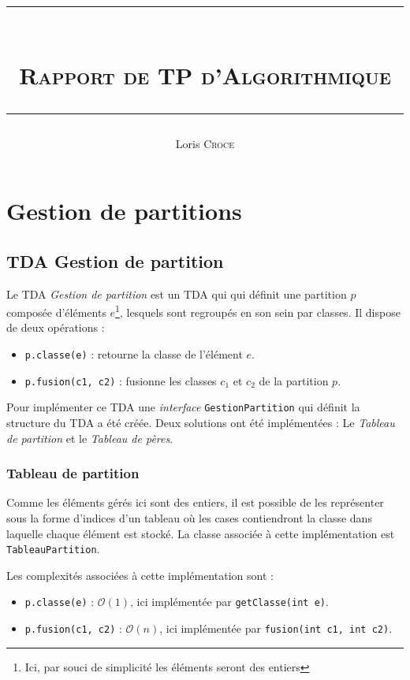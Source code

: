 \documentclass[12pt, a4paper]{report}
\author{Loris \textsc{Croce}}
\title{\rule{\textwidth}{1pt} \\ \Huge\textsc{Rapport de TP d'Algorithmique} \\ \rule{\textwidth}{1pt}}
\begin{document}
\maketitle{}

\tableofcontents

\chapter{Gestion de partitions}

    \section{TDA Gestion de partition}

    Le TDA \emph{Gestion de partition} est un TDA qui qui définit une partition $p$ composée d'éléments $e$\footnote{Ici, par souci de simplicité les éléments seront des entiers}, lesquels sont regroupés en son sein par classes. Il dispose de deux opérations :
    \begin{itemize}
        \item \texttt{p.classe(e)} : retourne la classe de l'élément $e$.
        \item \texttt{p.fusion(c1, c2)} : fusionne les classes $c_1$ et $c_2$ de la partition $p$.
    \end{itemize}


    Pour implémenter ce TDA une \emph{interface} \texttt{GestionPartition} qui définit la structure du TDA a été créée. Deux solutions ont été implémentées : Le \emph{Tableau de partition} et le \emph{Tableau de pères}.

    \subsection{Tableau de partition}

    Comme les éléments gérés ici sont des entiers, il est possible de les représenter sous la forme d'indices d'un tableau où les cases contiendront la classe dans laquelle chaque élément est stocké. La classe associée à cette implémentation est \texttt{TableauPartition}.

    Les complexités associées à cette implémentation sont :
    \begin{itemize}
        \item \texttt{p.classe(e)} : $\mathcal{O}(1)$, ici implémentée par \texttt{getClasse(int e)}.
        \item \texttt{p.fusion(c1, c2)} : $\mathcal{O}(n)$, ici implémentée par \texttt{fusion(int c1, int c2)}.
    \end{itemize}
\end{document}
